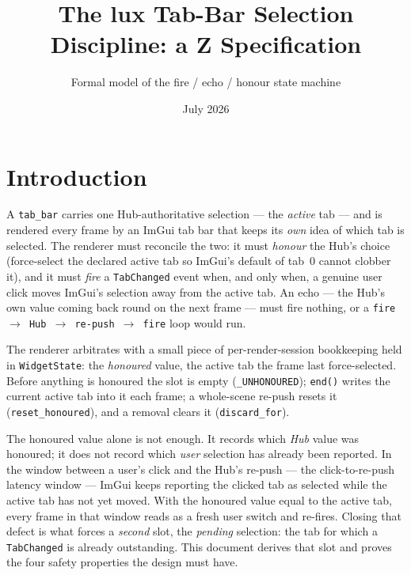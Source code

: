 \documentclass[a4paper,10pt,fleqn]{article}
\begin{document}
\title{The lux Tab-Bar Selection Discipline: a Z Specification}
\author{Formal model of the fire / echo / honour state machine}
\date{July 2026}
\maketitle

\section{Introduction}

A \texttt{tab\_bar} carries one Hub-authoritative selection --- the
\emph{active} tab --- and is rendered every frame by an ImGui tab bar that
keeps its \emph{own} idea of which tab is selected.  The renderer must
reconcile the two: it must \emph{honour} the Hub's choice (force-select the
declared active tab so ImGui's default of tab~0 cannot clobber it), and it
must \emph{fire} a \texttt{TabChanged} event when, and only when, a genuine
user click moves ImGui's selection away from the active tab.  An echo --- the
Hub's own value coming back round on the next frame --- must fire nothing, or
a \texttt{fire $\to$ Hub $\to$ re-push $\to$ fire} loop would run.

The renderer arbitrates with a small piece of per-render-session bookkeeping
held in \texttt{WidgetState}: the \emph{honoured} value, the active tab the
frame last force-selected.  Before anything is honoured the slot is empty
(\texttt{\_UNHONOURED}); \texttt{end()} writes the current active tab into it
each frame; a whole-scene re-push resets it (\texttt{reset\_honoured}), and a
removal clears it (\texttt{discard\_for}).

The honoured value alone is not enough.  It records which \emph{Hub} value was
honoured; it does not record which \emph{user} selection has already been
reported.  In the window between a user's click and the Hub's re-push --- the
click-to-re-push latency window --- ImGui keeps reporting the clicked tab as
selected while the active tab has not yet moved.  With the honoured value
equal to the active tab, every frame in that window reads as a fresh user
switch and re-fires.  Closing that defect is what forces a \emph{second} slot,
the \emph{pending} selection: the tab for which a \texttt{TabChanged} is
already outstanding.  This document derives that slot and proves the four
safety properties the design must have.
\end{document}
